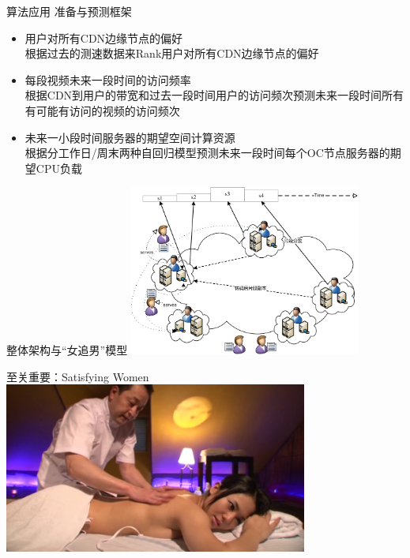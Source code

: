 \documentclass{beamer}
\begin{document}
\begin{frame}{算法应用}
准备与预测框架\\
\begin{itemize}
\item 用户对所有CDN边缘节点的偏好\\
根据过去的测速数据来Rank用户对所有CDN边缘节点的偏好
\item 每段视频未来一段时间的访问频率\\
根据CDN到用户的带宽和过去一段时间用户的访问频次预测未来一段时间所有有可能有访问的视频的访问频次
\item 未来一小段时间服务器的期望空间计算资源\\
根据分工作日/周末两种自回归模型预测未来一段时间每个OC节点服务器的期望CPU负载
\end{itemize}
\end{frame}
\begin{frame}{整体架构与“女追男”模型}
\includegraphics[height=5.6cm]{fig/transcoding_delivery.pdf}
\end{frame}
\begin{frame}{至关重要：Satisfying Women}
\includegraphics[height=5.6cm]{fig/massage2.png}
\end{frame}
\end{document}
